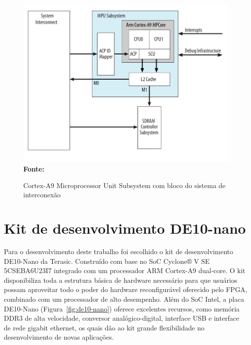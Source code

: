 \begin{figure}[ht]
	\caption{Cortex-A9 Microprocessor Unit Subsystem com bloco do sistema de interconexão}
	\begin{center}
		\includegraphics[scale=0.37]{imagens/mpusubsystem.png}\\
		{\small \textbf{Fonte:} }
    \end{center}\label{fig:mpusubsystem}
\end{figure}


\section{Kit de desenvolvimento DE10-nano}

Para o desenvolvimento deste trabalho foi escolhido o kit de desenvolvimento DE10-Nano da Terasic. Construído com base no SoC Cyclone® V SE 5CSEBA6U23I7 integrado com um processador ARM Cortex-A9 dual-core. O kit disponibiliza toda a estrutura básica de hardware necessário para que usuários possam aproveitar todo o poder do hardware reconfigurável oferecido pelo FPGA, combinado com um processador de alto desempenho. Além do SoC Intel, a placa DE10-Nano (Figura~\ref{fig:de10-nano}) oferece excelentes recursos, como memória DDR3 de alta velocidade, conversor analógico-digital, interface USB e interface de rede gigabit ethernet, os quais dão ao kit grande flexibilidade no desenvolvimento de novas aplicações. 

